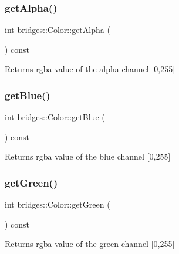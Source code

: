 \subsubsection{\texorpdfstring{get\+Alpha()}{getAlpha()}}
{\footnotesize\ttfamily int bridges\+::\+Color\+::get\+Alpha (\begin{DoxyParamCaption}{ }\end{DoxyParamCaption}) const\hspace{0.3cm}{\ttfamily [inline]}}

\begin{DoxyReturn}{Returns}
rgba value of the alpha channel \mbox{[}0,255\mbox{]} 
\end{DoxyReturn}
\mbox{\label{classbridges_1_1_color_aa7a70279f41f2cceb640162c43a2a382}} 
\subsubsection{\texorpdfstring{get\+Blue()}{getBlue()}}
{\footnotesize\ttfamily int bridges\+::\+Color\+::get\+Blue (\begin{DoxyParamCaption}{ }\end{DoxyParamCaption}) const\hspace{0.3cm}{\ttfamily [inline]}}

\begin{DoxyReturn}{Returns}
rgba value of the blue channel \mbox{[}0,255\mbox{]} 
\end{DoxyReturn}
\mbox{\label{classbridges_1_1_color_a93f8e016e1f1e6c177924ad8712e3e48}} 
\subsubsection{\texorpdfstring{get\+Green()}{getGreen()}}
{\footnotesize\ttfamily int bridges\+::\+Color\+::get\+Green (\begin{DoxyParamCaption}{ }\end{DoxyParamCaption}) const\hspace{0.3cm}{\ttfamily [inline]}}

\begin{DoxyReturn}{Returns}
rgba value of the green channel \mbox{[}0,255\mbox{]} 
\end{DoxyReturn}
\mbox{\label{classbridges_1_1_color_a051fa9e828ce7025093c65c46358a8cf}} 
